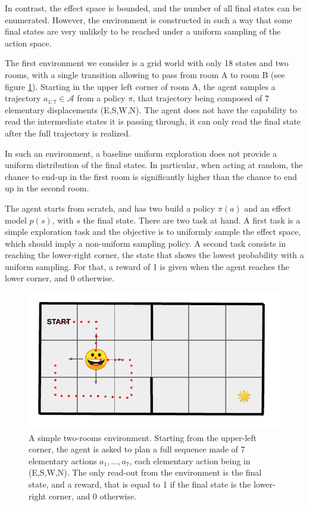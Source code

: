 \documentclass[runningheads]{llncs}
\begin{document}
In contrast, the effect space is bounded, and the number of all final states can be enumerated. However, the environment is constructed in such a way that some final states are very unlikely to be reached under a uniform sampling of the action space.


The first environment we consider is a grid world with only 18 states and two rooms, with a single transition allowing to pass from room A to room B (see figure \ref{fig:grid1}). Starting in the upper left corner of room A, the agent samples a trajectory $a_{1:7} \in \mathcal{A}$ from a policy $\pi$, that trajectory being composed of 7 elementary displacements (E,S,W,N). The agent does not have the capability to read the intermediate states it is passing through, it can only read the final state after the full trajectory is realized. 
    
In such an environment, a baseline uniform exploration does not provide a uniform distribution of the final states. In particular, when acting at random, the chance to end-up in the first room is significantly higher than the chance to end up in the second room.  
    
The agent starts from scratch, and has two build a policy $\pi(a)$ and an effect model $p(s)$, with $s$ the final state. 
There are two task at hand. A first task is a simple exploration task and the objective is to uniformly sample the effect space, which should imply a non-uniform sampling policy. A second task consists in reaching the lower-right corner, the state that shows the lowest probability with a uniform sampling. For that, a reward of 1 is given when the agent reaches the lower corner, and 0 otherwise.

\begin{figure}[t]\label{fig:grid1}
\centerline{
	\includegraphics[width = .7 \linewidth]{../figures/env-1.pdf} 
}
\caption{A simple two-rooms environment. Starting from the upper-left corner, the agent is asked to plan a full sequence made of 7 elementary actions $a_1,...,a_7$, each elementary action being in (E,S,W,N). The only read-out from the environment is the final state, and a reward, that is equal to 1 if the final state is the lower-right corner, and 0 otherwise.}
\end{figure}
\end{document}
